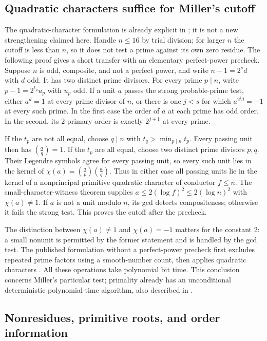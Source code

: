 \documentclass[11pt]{article}
\theoremstyle{definition}
\theoremstyle{remark}
\begin{document}
\subsection{Quadratic characters suffice for Miller's cutoff}

The quadratic-character formulation is already explicit in
\citet[Theorem~2.2, pp.~105--106]{Schoof2008}; it is not a new strengthening
claimed here. Handle $n\le16$ by trial division; for larger $n$ the cutoff
is less than $n$, so it does not test a prime against its own zero residue.
The following proof gives a short transfer with an elementary
perfect-power precheck. Suppose $n$ is odd, composite, and not a perfect power,
and write $n-1=2^s d$ with $d$ odd. It has two distinct prime divisors.
For every prime $p\mid n$, write $p-1=2^{t_p}u_p$ with $u_p$ odd.
If a unit $a$ passes the strong probable-prime test, either $a^d=1$ at every
prime divisor of $n$, or there is one $j<s$ for which
$a^{2^j d}=-1$ at every such prime. In the first case the order of $a$ at
each prime has odd order. In the second, its $2$-primary order is exactly
$2^{j+1}$ at every prime.

If the $t_p$ are not all equal, choose $q\mid n$ with
$t_q>\min_{p\mid n}t_p$. Every passing unit then has
$\left(\frac aq\right)=1$. If the $t_p$ are all equal, choose two distinct
prime divisors $p,q$. Their Legendre symbols agree for every passing unit,
so every such unit lies in the kernel of
$\chi(a)=\left(\frac ap\right)\left(\frac aq\right)$.
Thus in either case all passing units lie in the kernel of a nonprincipal
primitive quadratic character of conductor $f\le n$.
The small-character-witness theorem supplies
$a\le2(\log f)^2\le2(\log n)^2$ with $\chi(a)\ne1$.
If $a$ is not a unit modulo $n$, its gcd detects compositeness; otherwise
it fails the strong test. This proves the cutoff after the precheck.

The distinction between $\chi(a)\ne1$ and $\chi(a)=-1$ matters for the
constant $2$: a small nonunit is permitted by the former statement and is
handled by the gcd test. The published formulation without a perfect-power
precheck first excludes repeated prime factors using a smooth-number count,
then applies quadratic characters \citep[pp.~105--106]{Schoof2008}.
All these operations take polynomial bit time. This conclusion concerns
Miller's particular test; primality already has an unconditional deterministic
polynomial-time algorithm, also described in \citet[Section~3]{Schoof2008}.

\subsection{Nonresidues, primitive roots, and order information}
\end{document}
